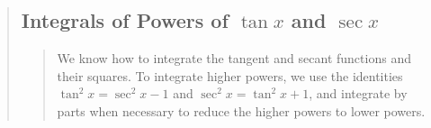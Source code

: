 \documentclass{report}
\begin{document}
\begin{quote}
	\subsection{Integrals of Powers of $\tan x$ and $\sec x$}
	\begin{quote}

		We know how to integrate the tangent and secant functions and their squares. To integrate higher powers, we use the identities $\tan^2x = \sec^2 x - 1$ and $\sec^2 x = \tan^2 x + 1$, and integrate by parts when necessary to reduce the higher powers to lower powers.
		
	\end{quote}

\end{quote}

\end{document}
